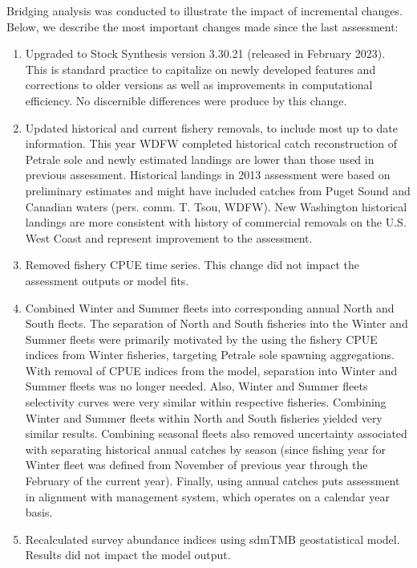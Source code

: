 \documentclass[
]{scrartcl}
\begin{document}
Bridging analysis was conducted to illustrate the impact of incremental
changes. Below, we describe the most important changes made since the
last assessment:

\begin{enumerate}

\item Upgraded to Stock Synthesis version 3.30.21 (released in February 2023). This is standard practice to capitalize on newly developed features and corrections to older versions as well as improvements in computational efficiency.  No discernible differences were produce by this change.

\item Updated historical and current fishery removals, to include most up to date information. This year WDFW completed historical catch reconstruction of Petrale sole and newly estimated landings are lower than those used in previous assessment. Historical landings in 2013 assessment were based on preliminary estimates and might have included catches from Puget Sound and Canadian waters (pers. comm. T. Tsou, WDFW). New Washington historical landings are more consistent with history of commercial removals on the U.S. West Coast and represent improvement to the assessment. 

\item Removed fishery CPUE time series. This change did not impact the assessment outputs or model fits.

\item Combined Winter and Summer fleets into corresponding annual North and South fleets. The separation of North and South fisheries into the Winter and Summer fleets were primarily motivated by the using the fishery CPUE indices from Winter fisheries, targeting Petrale sole spawning aggregations. With removal of CPUE indices from the model, separation into Winter and Summer fleets was no longer needed. Also, Winter and Summer fleets selectivity curves were very similar within respective fisheries. Combining Winter and Summer fleets within North and South fisheries yielded very similar results. Combining seasonal fleets also removed uncertainty associated with separating historical annual catches by season (since fishing year for Winter fleet was defined from November of previous year through the February of the current year). Finally, using annual catches puts assessment in alignment with management system, which operates on a calendar year basis.  

\item Recalculated survey abundance indices using sdmTMB geostatistical model. Results did not impact the model output.


\end{enumerate}
\end{document}

